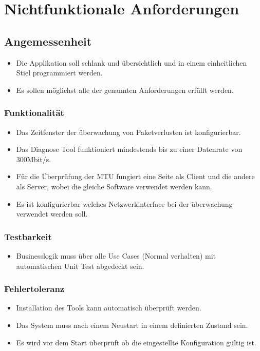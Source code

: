 \section{Nichtfunktionale Anforderungen}
\label{sec:Nichtfunktionale Anforderungen}

\subsection{Angemessenheit}
\begin{itemize}
	\item Die Applikation soll schlank und übersichtlich und in einem einheitlichen Stiel programmiert werden.
	\item Es sollen möglichst alle der genannten Anforderungen erfüllt werden.
\end{itemize}

\subsubsection{Funktionalität}
\begin{itemize}
\item Das Zeitfenster der überwachung von Paketverlusten ist konfigurierbar.
\item Das Diagnose Tool funktioniert mindestends bis zu einer Datenrate von 300Mbit/s.
\item Für die Überprüfung der MTU fungiert eine Seite als Client und die andere als Server, wobei die gleiche Software verwendet werden kann.
\item Es ist konfigurierbar welches Netzwerkinterface bei der überwachung verwendet werden soll.
\end{itemize}

\subsubsection{Testbarkeit}
\begin{itemize}
\item Businesslogik muss über alle Use Cases (Normal verhalten) mit automatischen Unit Test abgedeckt sein.
\end{itemize}

\subsubsection{Fehlertoleranz}
\begin{itemize}
\item Installation des Tools kann automatisch überprüft werden.
\item Das System muss nach einem Neustart in einem definierten Zustand sein.
\item Es wird vor dem Start überprüft ob die eingestellte Konfiguration gültig ist.
\end{itemize}

